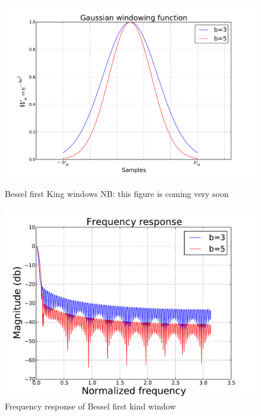\documentclass[useAMS,usenatbib]{mn2e}
\begin{document}
\begin{figure}
  \centering
\begin{minipage}{0.36\linewidth}\includegraphics[width=1\textwidth]{./Figures/gausian.pdf}\caption{Bessel 
first King windows NB: this figure is coming very soon}\label{fig:fig_4}\end{minipage}
\hspace{1cm}
\begin{minipage}{0.36\linewidth}\includegraphics[width=1\textwidth]{./Figures/freq_resp_gaussian.pdf}\caption{Frequency 
response of Bessel first kind window}\label{fig:fig_5} \end {minipage}
\end{figure}
\end{document}
